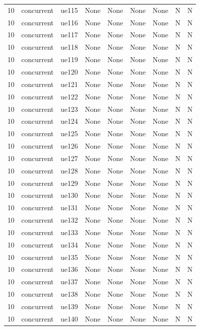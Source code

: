 \begin{table}[ht]
\begin{tabular}{|c|c|c|c|c|c|c|c|c|}
10 & concurrent & ue115 & None & None & None & None & N & N \\
10 & concurrent & ue116 & None & None & None & None & N & N \\
10 & concurrent & ue117 & None & None & None & None & N & N \\
10 & concurrent & ue118 & None & None & None & None & N & N \\
10 & concurrent & ue119 & None & None & None & None & N & N \\
10 & concurrent & ue120 & None & None & None & None & N & N \\
10 & concurrent & ue121 & None & None & None & None & N & N \\
10 & concurrent & ue122 & None & None & None & None & N & N \\
10 & concurrent & ue123 & None & None & None & None & N & N \\
10 & concurrent & ue124 & None & None & None & None & N & N \\
10 & concurrent & ue125 & None & None & None & None & N & N \\
10 & concurrent & ue126 & None & None & None & None & N & N \\
10 & concurrent & ue127 & None & None & None & None & N & N \\
10 & concurrent & ue128 & None & None & None & None & N & N \\
10 & concurrent & ue129 & None & None & None & None & N & N \\
10 & concurrent & ue130 & None & None & None & None & N & N \\
10 & concurrent & ue131 & None & None & None & None & N & N \\
10 & concurrent & ue132 & None & None & None & None & N & N \\
10 & concurrent & ue133 & None & None & None & None & N & N \\
10 & concurrent & ue134 & None & None & None & None & N & N \\
10 & concurrent & ue135 & None & None & None & None & N & N \\
10 & concurrent & ue136 & None & None & None & None & N & N \\
10 & concurrent & ue137 & None & None & None & None & N & N \\
10 & concurrent & ue138 & None & None & None & None & N & N \\
10 & concurrent & ue139 & None & None & None & None & N & N \\
10 & concurrent & ue140 & None & None & None & None & N & N \\

\end{tabular}
\end{table}
